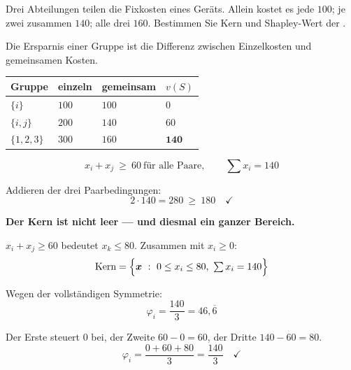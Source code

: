 \begin{aufgabe}
Drei Abteilungen teilen die Fixkosten eines Geräts. Allein kostet es jede $100$; je zwei zusammen $140$; alle drei $160$. Bestimmen Sie Kern und Shapley-Wert der .

\loesung
{}
Die Ersparnis einer Gruppe ist die Differenz zwischen Einzelkosten und gemeinsamen Kosten.
\begin{center}
{\small
\renewcommand{\arraystretch}{1.48}
\begin{tabular}{@{}P{1.8cm}P{2.0cm}P{2.0cm}P{1.8cm}@{}}
\toprule
\textbf{Gruppe} & \textbf{einzeln} & \textbf{gemeinsam} & $v(S)$\\
\midrule
$\{i\}$ & $100$ & $100$ & $0$\\
$\{i,j\}$ & $200$ & $140$ & $60$\\
$\{1,2,3\}$ & $300$ & $160$ & $\mathbf{140}$\\
\bottomrule
\end{tabular}}
\end{center}

\[ x_i+x_j \ \ge\ 60 \ \text{für alle Paare}, \qquad \textstyle\sum x_i = 140 \]

Addieren der drei Paarbedingungen:
\[ 2\cdot140 = 280 \ \ge\ 180 \quad \checkmark \]

\begin{center}
\begin{minipage}{0.9\textwidth}
\textbf{Der Kern ist nicht leer --- und diesmal ein ganzer Bereich.}
\end{minipage}
\end{center}

 $x_i+x_j \ge 60$ bedeutet $x_k \le 80$. Zusammen mit $x_i \ge 0$:
\[ \text{Kern} = \Bigl\{\boldsymbol{x} \ : \ 0 \le x_i \le 80, \ \textstyle\sum x_i = 140\Bigr\} \]

Wegen der vollständigen Symmetrie:
\[ \varphi_i = \frac{140}{3} = 46{,}\overline{6} \]

 Der Erste steuert $0$ bei, der Zweite $60-0 = 60$, der Dritte $140-60 = 80$.
\[ \varphi_i = \frac{0+60+80}{3} = \frac{140}{3} \quad \checkmark \]

\begin{center}
\begin{minipage}{0.86\textwidth}
\end{minipage}
\end{center}


\end{aufgabe}
